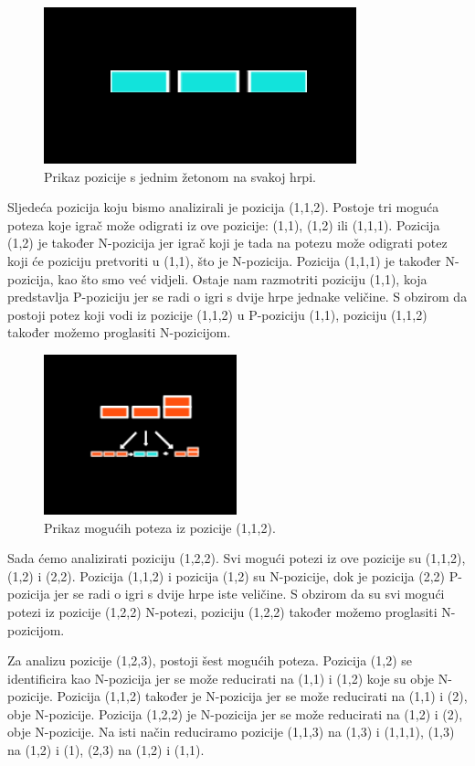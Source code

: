 \begin{figure}[H]
\centering
\includegraphics[]{slike-analiza/slika2.png}
\caption{Prikaz pozicije s jednim žetonom na svakoj hrpi.}
\label{}
\end{figure}

Sljedeća pozicija koju bismo analizirali je pozicija (1,1,2). Postoje tri moguća poteza koje igrač može odigrati iz ove pozicije: (1,1), (1,2) ili (1,1,1). Pozicija (1,2) je također N-pozicija jer igrač koji je tada na potezu može odigrati potez koji će poziciju pretvoriti u (1,1), što je N-pozicija. Pozicija (1,1,1) je također N-pozicija, kao što smo već vidjeli. Ostaje nam razmotriti poziciju (1,1), koja predstavlja P-poziciju jer se radi o igri s dvije hrpe jednake veličine. S obzirom da postoji potez koji vodi iz pozicije (1,1,2) u P-poziciju (1,1), poziciju (1,1,2) također možemo proglasiti N-pozicijom.


\begin{figure}[H]
\centering
\includegraphics[]{slike-analiza/slika3.png}
\caption{Prikaz mogućih poteza iz pozicije (1,1,2).}
\label{}
\end{figure}

Sada ćemo analizirati poziciju (1,2,2). Svi mogući potezi iz ove pozicije su (1,1,2), (1,2) i (2,2). Pozicija (1,1,2) i pozicija (1,2) su N-pozicije, dok je pozicija (2,2) P-pozicija jer se radi o igri s dvije hrpe iste veličine. S obzirom da su svi mogući potezi iz pozicije (1,2,2) N-potezi, poziciju (1,2,2) također možemo proglasiti N-pozicijom.

Za analizu pozicije (1,2,3), postoji šest mogućih poteza. Pozicija (1,2) se identificira kao N-pozicija jer se može reducirati na (1,1) i (1,2) koje su obje N-pozicije. Pozicija (1,1,2) također je N-pozicija jer se može reducirati na (1,1) i (2), obje N-pozicije. 
Pozicija (1,2,2) je N-pozicija jer se može reducirati na (1,2) i (2), obje N-pozicije. Na isti način reduciramo pozicije (1,1,3) na (1,3) i (1,1,1), (1,3) na (1,2) i (1), (2,3) na (1,2) i (1,1).
 
